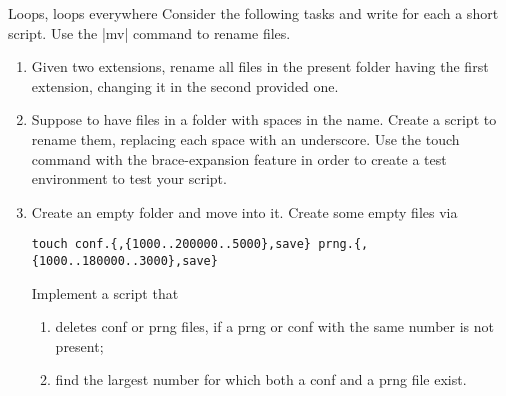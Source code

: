 
\begin{exercise}[Instructive]{Loops, loops everywhere}
    Consider the following tasks and write for each a short script.
    Use the \bash|mv| command to rename files.
    \begin{enumerate}[itemsep=-2pt, after=\vspace{-0.6\baselineskip}]
        \item Given two extensions, rename all files in the present folder having the first extension, changing it in the second provided one.
        \item Suppose to have files in a folder with spaces in the name.
              Create a script to rename them, replacing each space with an underscore.
              Use the touch command with the brace-expansion feature in order to create a test environment to test your script.
        \item Create an empty folder and move into it.
              Create some empty files via
              \begin{lstlisting}[style=MyBash, numbers=none]
                  touch conf.{,{1000..200000..5000},save} prng.{,{1000..180000..3000},save}
              \end{lstlisting}
              Implement a script that
              \begin{enumerate}[nosep, after=\vspace{-0.6\baselineskip}]
                  \item deletes conf or prng files, if a prng or conf with the same number is not present;
                  \item find the largest number for which both a conf and a prng file exist.
              \end{enumerate}
    \end{enumerate}
    \bigskip
\end{exercise}

